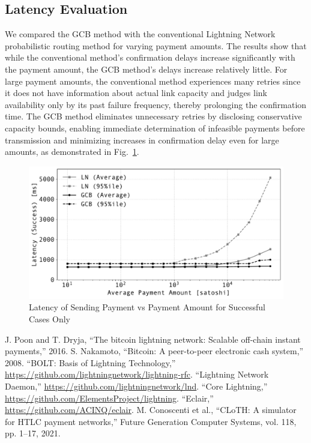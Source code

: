 \documentclass[a4paper]{IEEEtran}
\begin{document}
\subsection{Latency Evaluation}

We compared the GCB method with the conventional Lightning Network probabilistic routing method for varying payment amounts.
The results show that while the conventional method's confirmation delays increase significantly with the payment amount, the GCB method's delays increase relatively little.
For large payment amounts, the conventional method experiences many retries since it does not have information about actual link capacity and judges link availability only by its past failure frequency, thereby prolonging the confirmation time.
The GCB method eliminates unnecessary retries by disclosing conservative capacity bounds, enabling immediate determination of infeasible payments before transmission and minimizing increases in confirmation delay even for large amounts, as demonstrated in Fig.~\ref{fig:pmt_amt_vs_time}.

\begin{figure}[htbp]
	\centerline{\includegraphics[width=\linewidth]{fig/pmt_amt_vs_time}}
	\caption{Latency of Sending Payment vs Payment Amount for Successful Cases Only}
	\label{fig:pmt_amt_vs_time}
\end{figure}

\begin{thebibliography}{00}
	 J. Poon and T. Dryja, ``The bitcoin lightning network: Scalable off-chain instant payments,'' 2016.
	 S. Nakamoto, ``Bitcoin: A peer-to-peer electronic cash system,'' 2008.
	 ``BOLT: Basis of Lightning Technology,'' \url{https://github.com/lightningnetwork/lightning-rfc}.
	 ``Lightning Network Daemon,'' \url{https://github.com/lightningnetwork/lnd}.
	 ``Core Lightning,'' \url{https://github.com/ElementsProject/lightning}.
	 ``Eclair,'' \url{https://github.com/ACINQ/eclair}.
	 M. Conoscenti et al., ``CLoTH: A simulator for HTLC payment networks,'' Future Generation Computer Systems, vol. 118, pp. 1--17, 2021.
\end{thebibliography}
\end{document}

